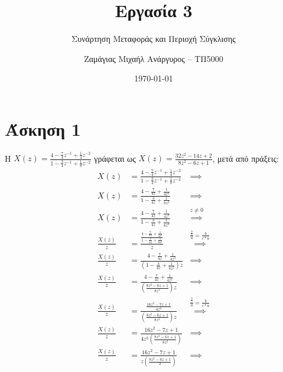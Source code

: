 \documentclass[12pt]{turabian-researchpaper}
\title{Εργασία 3}
\subtitle{Συνάρτηση Μεταφοράς και Περιοχή Σύγκλισης}
\author{Ζαμάγιας Μιχαήλ Ανάργυρος -- ΤΠ5000}
\date{\today}
\begin{document}
\begin{titlepage}
    \maketitle
\end{titlepage}

\tableofcontents

\newpage\section{Άσκηση 1}
Η $ X(z) = \frac{4-\frac{7}{4}z^{-1}+\frac{1}{4}z^{-2}}{1-\frac{3}{4}z^{-1}+\frac{1}{8}z^{-2}} $ γράφεται ως $ X(z) = \frac{32z^2-14z+2}{8z^2-6z+1} $, μετά από πράξεις:
\begin{equation*}\label{eq1}
    \begin{aligned}
        X(z)           & = \frac{4-\frac{7}{4}z^{-1}+\frac{1}{4}z^{-2}}{1-\frac{3}{4}z^{-1}+\frac{1}{8}z^{-2}} & \implies                                                \\
        X(z)           & = \frac{4-\frac{7}{4z}+\frac{1}{4z^2}}{1-\frac{3}{4z}+\frac{1}{8z^2}}                 & \implies                                                \\
        X(z)           & = \frac{4-\frac{7}{4z}+\frac{1}{4z^2}}{1-\frac{3}{4z}+\frac{1}{8z^2}}                 & \overset{z\neq0}{\implies}                              \\
        \frac{X(z)}{z} & = \frac{\frac{4-\frac{7}{4z}+\frac{1}{4z^2}}{1-\frac{3}{4z}+\frac{1}{8z^2}}}{z}       & \overset{\frac{\frac{b}{c}}{a}=\frac{b}{c*a}}{\implies} \\
        \frac{X(z)}{z} & = \frac{4-\frac{7}{4z}+\frac{1}{4z^2}}{(1-\frac{3}{4z}+\frac{1}{8z^2})z}              & \implies                                                \\
        \frac{X(z)}{z} & = \frac{4-\frac{7}{4z}+\frac{1}{4z^2}}{(\frac{8z^2-6z+1}{8z^2})z}                     & \implies                                                \\
        \frac{X(z)}{z} & = \frac{\frac{16z^2-7z+1}{4z^2}}{(\frac{8z^2-6z+1}{8z^2})z}                           & \overset{\frac{\frac{b}{c}}{a}=\frac{b}{c*a}}{\implies} \\
        \frac{X(z)}{z} & = \frac{16z^2-7z+1}{4z^3(\frac{8z^2-6z+1}{8z^2})}                                     & \implies                                                \\
        \frac{X(z)}{z} & = \frac{16z^2-7z+1}{z(\frac{8z^2-6z+1}{2})}                                           & \implies                                                \\

\end{aligned}
\end{equation*}
\end{document}
